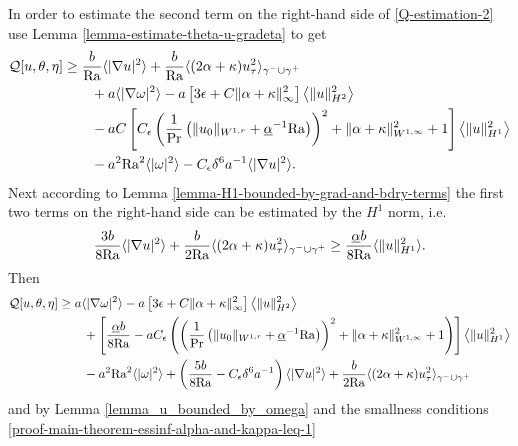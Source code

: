 \documentclass{article}
\theoremstyle{definition}
\theoremstyle{definition}
\newcommand{\Pra}{\rm{Pr}}
\newcommand{\Ra}{{\rm{Ra}}}
\begin{document}
In order to estimate the second term on the right-hand side of \eqref{Q-estimation-2} use Lemma \eqref{lemma-estimate-theta-u-gradeta} to get
\begin{align*}
        \mathcal{Q}[u,\theta,\eta]
        &\geq \frac{b}{\Ra}\langle |\nabla u|^2\rangle + \frac{b}{\Ra}\langle (2\alpha+\kappa)u_\tau^2\rangle_{\gamma^-\cup\gamma^+} 
        \\
        &\qquad + a\langle |\nabla \omega|^2\rangle - a\left[3\epsilon+C\|\alpha+\kappa\|_\infty^2 \right]\left\langle \|u\|_{H^2}^2\right\rangle
        \\
        &\qquad - aC\left[ C_\epsilon\left(\frac{1}{\Pra}\left(\|u_0\|_{W^{1,r}} + \underline{\alpha}^{-1}\Ra\right)\right)^2+\|\alpha+\kappa\|_{W^{1,\infty}}^2+1 \right]\left\langle\|u\|_{H^1}^2\right\rangle 
        \\
        &\qquad - a^2 \Ra^2 \langle |\omega|^2\rangle- C_{\epsilon}\delta^6 a^{-1}\langle |\nabla u|^2\rangle.
\end{align*}
Next according to Lemma \eqref{lemma-H1-bounded-by-grad-and-bdry-terms} the first two terms on the right-hand side can be estimated by the $H^1$ norm, i.e.
\begin{align}
    \label{main-theorem-lemma-H1-bounded-by-grad-bdry-terms-explicite-used-formula}
    \frac{3b}{8\Ra}\langle |\nabla u|^2\rangle + \frac{b}{2\Ra} \langle (2\alpha+\kappa) u_\tau^2 \rangle_{\gamma^-\cup\gamma^+} \geq \frac{\underline{\alpha}b}{8\Ra}   \langle \|u\|_{H^1}^2 \rangle.
\end{align}
Then
\begin{align*}
        \mathcal{Q}[u,\theta,\eta]
        &\geq a\langle |\nabla \omega|^2\rangle - a\left[3\epsilon+C\|\alpha+\kappa\|_\infty^2 \right]\left\langle \|u\|_{H^2}^2\right\rangle
        \\
        &\qquad + \left[\frac{\underline{\alpha} b}{8\Ra} - a C_\epsilon\left(\left(\frac{1}{\Pra}\left(\|u_0\|_{W^{1,r}} +\underline{\alpha}^{-1}\Ra\right)\right)^2+\|\alpha+\kappa\|_{W^{1,\infty}}^2+1\right) \right]\left\langle\|u\|_{H^1}^2\right\rangle
        \\
        &\qquad - a^2 \Ra^2 \langle |\omega|^2\rangle + \left(\frac{5b}{8\Ra}-C_\epsilon\delta^6 a^{-1}\right) \langle |\nabla u|^2\rangle + \frac{b}{2\Ra}\langle (2\alpha+\kappa)u_\tau^2\rangle_{\gamma^-\cup\gamma^+}
\end{align*}
and by Lemma \ref{lemma_u_bounded_by_omega} and the smallness conditions \eqref{proof-main-theorem-essinf-alpha-and-kappa-leq-1}
\end{document}
